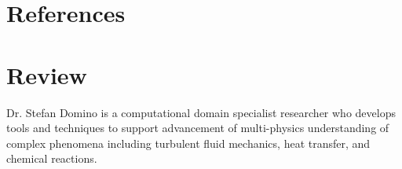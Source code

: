 \documentclass[letterpaper]{twentysecondcv_spd} %
\begin{document}
\section{References}

\begin{twentysingle} %
\end{twentysingle}

\section{Review}

Dr. Stefan Domino is a computational domain specialist researcher who develops tools and techniques
to support advancement of multi-physics understanding of complex phenomena including turbulent 
fluid mechanics, heat transfer, and chemical reactions.
\end{document}
